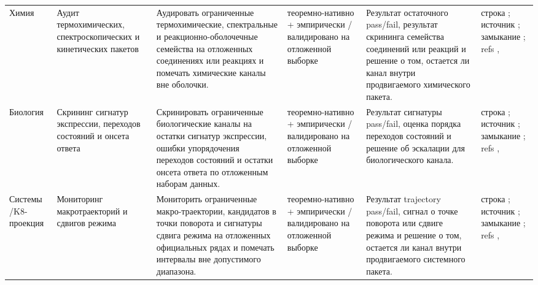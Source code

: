 \begin{longtable}{@{}L{0.11\textwidth}L{0.16\textwidth}L{0.19\textwidth}L{0.12\textwidth}L{0.18\textwidth}L{0.16\textwidth}@{}}
Химия & Аудит термохимических, спектроскопических и кинетических пакетов & Аудировать ограниченные термохимические, спектральные и реакционно-оболочечные семейства на отложенных соединениях или реакциях и помечать химические каналы вне оболочки. & теоремно-нативно + эмпирически / валидировано на отложенной выборке & Результат остаточного pass/fail, результат скрининга семейства соединений или реакций и решение о том, остается ли канал внутри продвигаемого химического пакета. & строка ; \allowbreak источник ; \allowbreak замыкание ; \allowbreak refs , \allowbreak {} \\
Биология & Скрининг сигнатур экспрессии, переходов состояний и онсета ответа & Скринировать ограниченные биологические каналы на остатки сигнатур экспрессии, ошибки упорядочения переходов состояний и остатки онсета ответа по отложенным наборам данных. & теоремно-нативно + эмпирически / валидировано на отложенной выборке & Результат сигнатуры pass/fail, оценка порядка переходов состояний и решение об эскалации для биологического канала. & строка ; \allowbreak источник ; \allowbreak замыкание ; \allowbreak refs , \allowbreak {} \\
Системы /\allowbreak K8-проекция & Мониторинг макротраекторий и сдвигов режима & Мониторить ограниченные макро-траектории, кандидатов в точки поворота и сигнатуры сдвига режима на отложенных официальных рядах и помечать интервалы вне допустимого диапазона. & теоремно-нативно + эмпирически / валидировано на отложенной выборке & Результат trajectory pass/fail, сигнал о точке поворота или сдвиге режима и решение о том, остается ли канал внутри продвигаемого системного пакета. & строка ; \allowbreak источник ; \allowbreak замыкание ; \allowbreak refs , \allowbreak {} \\

\end{longtable}
